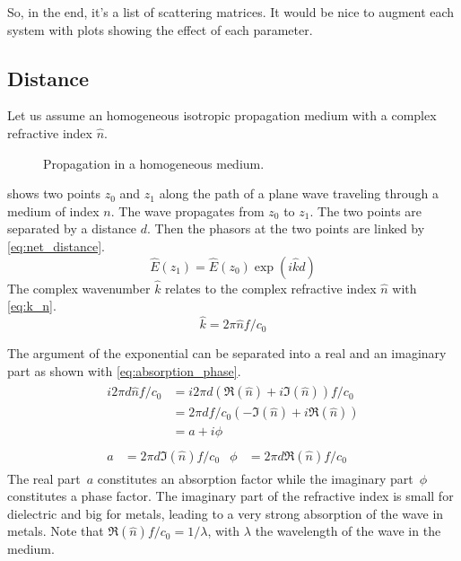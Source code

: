 So, in the end, it's a list of scattering matrices.  It would be nice to augment each system with plots showing the effect of each parameter.




\subsection{Distance}
\label{sec:generic_networks_distance}
Let us assume an homogeneous isotropic propagation medium with a complex refractive index $\hat{n}$.

\begin{figure}[hbtp]
    \centering
    \caption{\label{fig:net_distance} Propagation in a homogeneous medium.}
\end{figure}
 shows two points $z_0$ and $z_1$ along the path of a plane wave traveling through a medium of index $n$.
The wave propagates from $z_0$ to $z_1$.
The two points are separated by a distance $d$.
Then the phasors at the two points are linked by \cref{eq:net_distance}.
\begin{equation}
    \hat{E}(z_1) = \hat{E}(z_0) \exp(i\hat{k}d)
    \label{eq:net_distance}
\end{equation}
The complex wavenumber $\hat{k}$ relates to the complex refractive index $\hat{n}$ with \cref{eq:k_n}.
\begin{equation}
    \hat{k} = 2\pi \hat{n} f / c_0 \label{eq:k_n}
\end{equation}

The argument of the exponential can be separated into a real and an imaginary part as shown with \cref{eq:absorption_phase}.
\begin{gather}
    \begin{aligned}
        i 2\pi d \hat{n} f / c_0
        &= i 2\pi d \left(\Re(\hat{n}) + i\Im(\hat{n})\right) f / c_0 \\
        &= 2\pi d f / c_0 \left(-\Im(\hat{n}) + i\Re(\hat{n}) \right) \\
        &= a + i \phi
    \end{aligned}
    \label{eq:absorption_phase}
    \\
    \begin{aligned}
        a &= 2\pi d \Im(\hat{n}) f / c_0   &   \phi &= 2\pi d \Re(\hat{n}) f / c_0
    \end{aligned}
\end{gather}
The real part~$a$ constitutes an absorption factor while the imaginary part~$\phi$ constitutes a phase factor.
The imaginary part of the refractive index is small for dielectric and big for metals,
leading to a very strong absorption of the wave in metals.
Note that $\Re(\hat{n}) f / c_0 = 1 / \lambda$, with $\lambda$ the wavelength of the wave in the medium.

